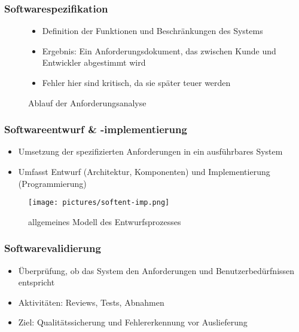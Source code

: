 \documentclass[12pt,a4paper,oneside]{article}
\begin{document}
\subsubsection{Softwarespezifikation}

\begin{figure}[H]
\begin{minipage}[t]{0.45\textwidth}
\begin{itemize}
\item Definition der Funktionen und Beschränkungen des Systems
\item Ergebnis: Ein Anforderungsdokument, das zwischen Kunde und Entwickler abgestimmt wird
\item Fehler hier sind kritisch, da sie später teuer werden
\end{itemize}
\end{minipage}
\hfill
\begin{minipage}[t]{0.45\textwidth}
\centering
\vspace{-15mm}
\caption{Ablauf der Anforderungsanalyse}
\end{minipage}
\end{figure}

\newpage

\subsubsection{Softwareentwurf \& -implementierung}

\begin{itemize}
\item Umsetzung der spezifizierten Anforderungen in ein ausführbares System
\item Umfasst Entwurf (Architektur, Komponenten) und Implementierung (Programmierung)
\end{itemize}

\begin{figure}[H]
\centering
\texttt{[image: pictures/softent-imp.png]}
\caption{allgemeines Modell des Entwurfsprozesses}
\end{figure}

\subsubsection{Softwarevalidierung}
\begin{itemize}
\item Überprüfung, ob das System den Anforderungen und Benutzerbedürfnissen entspricht
\item Aktivitäten: Reviews, Tests, Abnahmen
\item Ziel: Qualitätssicherung und Fehlererkennung vor Auslieferung
\end{itemize}
\end{document}
